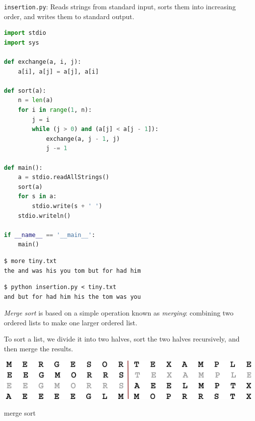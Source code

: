 \documentclass[8pt,a4paper,compress,handout]{beamer}
\begin{document}
\begin{frame}[fragile]
\begin{framed}
\tiny \lstinline{insertion.py}: Reads strings from standard input, sorts them into increasing order, and writes them to standard output.
\end{framed}

\begin{lstlisting}[language=Python]
import stdio
import sys

def exchange(a, i, j):
    a[i], a[j] = a[j], a[i]

def sort(a):
    n = len(a)
    for i in range(1, n):
        j = i
        while (j > 0) and (a[j] < a[j - 1]):
            exchange(a, j - 1, j)
            j -= 1

def main():
    a = stdio.readAllStrings()
    sort(a)
    for s in a:
        stdio.write(s + ' ')
    stdio.writeln()

if __name__ == '__main__':
    main()
\end{lstlisting}

\begin{lstlisting}[language={}]
$ more tiny.txt 
the and was his you tom but for had him
\end{lstlisting}

\begin{lstlisting}[language={}]
$ python insertion.py < tiny.txt 
and but for had him his the tom was you 
\end{lstlisting}
\end{frame}

\begin{frame}[fragile]
\emph{Merge sort} is based on a simple operation known as \emph{merging}: combining two ordered lists to make one larger ordered list.

\bigskip

To sort a list, we divide it into two halves, sort the two halves recursively, and then merge the results.

\begin{center}
\includegraphics[scale=0.3]{figures/merge.png}

\smallskip

\tiny merge sort
\end{center}
\end{frame}
\end{document}

